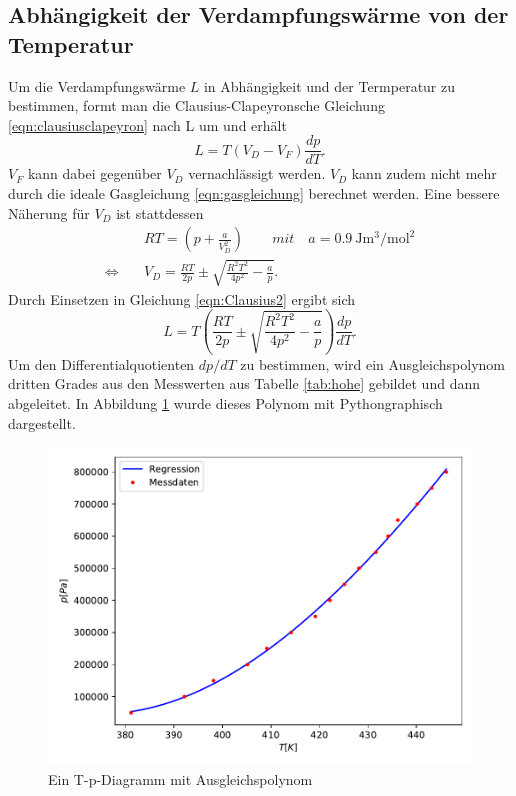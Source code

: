 \subsection{Abhängigkeit der Verdampfungswärme von der Temperatur}
Um die Verdampfungswärme $L$ in Abhängigkeit und der Termperatur zu bestimmen, formt man die
Clausius-Clapeyronsche Gleichung \eqref{eqn:clausiusclapeyron} nach L um und erhält
\begin{equation}
  L=T(V_D-V_F)\frac{dp}{dT}. \label{eqn:Clausius2}
\end{equation}
$V_F$ kann dabei gegenüber $V_D$ vernachlässigt werden. $V_D$ kann zudem nicht mehr durch die
ideale Gasgleichung \eqref{eqn:gasgleichung} berechnet werden. Eine bessere Näherung für $V_D$
ist stattdessen 
\begin{align}
  &RT=\left(p+\frac{a}{V_D^2}\right) \qquad mit \quad a=\SI{0.9}{\joule\cubic\metre\per\square\mole}\\
  \Leftrightarrow \quad &V_D=\frac{RT}{2p}\pm\sqrt{\frac{R^2T^2}{4p^2}-\frac{a}{p}}. \label{eqn:Vd}
\end{align}
Durch Einsetzen in Gleichung \eqref{eqn:Clausius2} ergibt sich
\begin{equation}
  L=T\left(\frac{RT}{2p}\pm\sqrt{\frac{R^2T^2}{4p^2}-\frac{a}{p}}\right)\frac{dp}{dT}. \label{eqn:Clausius3}
\end{equation}
Um den Differentialquotienten $dp/dT$ zu bestimmen, wird ein Ausgleichspolynom dritten Grades
aus den Messwerten aus Tabelle \ref{tab:hohe} gebildet und dann abgeleitet. In Abbildung
\ref{fig:Polynom} wurde dieses Polynom mit Pythongraphisch dargestellt.
\begin{figure}
  \centering
  \includegraphics[scale = 0.75]{Auswertung/d1.pdf}
  \caption{Ein T-p-Diagramm mit Ausgleichspolynom}
  \label{fig:Polynom}
\end{figure}
